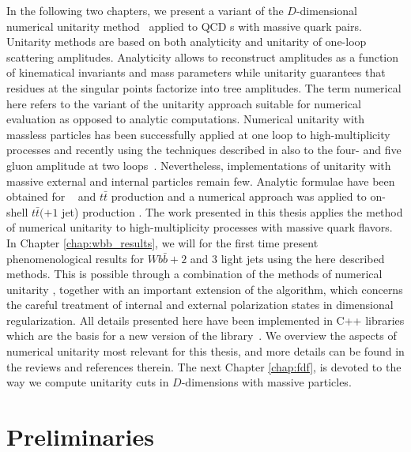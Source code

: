 In the following two chapters, we present a variant of the
$D$-dimensional numerical unitarity method~\cite{Bern:1997sc,Britto:2004nc,Ellis:2007br,Giele:2008ve,Ellis:2008ir} applied to QCD \ola s with massive quark pairs. Unitarity methods are based on both
analyticity and unitarity of one-loop scattering amplitudes. Analyticity allows to reconstruct amplitudes as a function of kinematical invariants and mass parameters while unitarity guarantees that residues at the
singular points factorize into tree amplitudes. The term numerical here refers to the variant of the unitarity approach suitable for numerical evaluation as opposed to analytic computations. Numerical unitarity
with massless particles has been successfully applied at one loop to high-multiplicity processes \cite{BH:W5j,BH:Z4j,FebresCordero2017} and recently using
the techniques described in \cite{Ita2016} also to the four- and five gluon
amplitude at two loops~\cite{Abreu:2017xsl,Abreu:2017idw}. Nevertheless, implementations of
unitarity with massive external and internal particles remain few. Analytic formulae
have been obtained for \Wbb~\cite{Badger:2010mg} and $t\bar{t}$ production
\cite{Badger:2011yu} and a numerical approach was applied to on-shell $t\bar{t}(+1$
jet) production \cite{Melnikov:2009dn,Melnikov:2010iu}. The work
presented in this thesis applies the method of numerical unitarity to
high-multiplicity processes with massive quark flavors. In Chapter
\ref{chap:wbb_results}, we will for the
first time present phenomenological results
for $Wb\bar{b}+2$ and $3$ light jets using the here described
methods. This is possible through a combination of the methods of numerical unitarity
\cite{BlackHatI,Ellis:2007br,Ellis:2008ir}, together with an important extension of the algorithm, which concerns the careful treatment of internal and external polarization states in dimensional regularization. All details presented here
have been implemented in C++ libraries which are the basis for a new
version of the \BlackHat{} library~\cite{BlackHatI}. We overview the aspects of numerical
unitarity most relevant for this thesis, and more details can be found
in the reviews \cite{Ita:2011hi,Ellis:2011cr} and references therein. The next Chapter
\ref{chap:fdf}, is devoted to the way we compute unitarity cuts in
$D$-dimensions with massive particles.


\section{Preliminaries}
\label{sec:unitarity}
